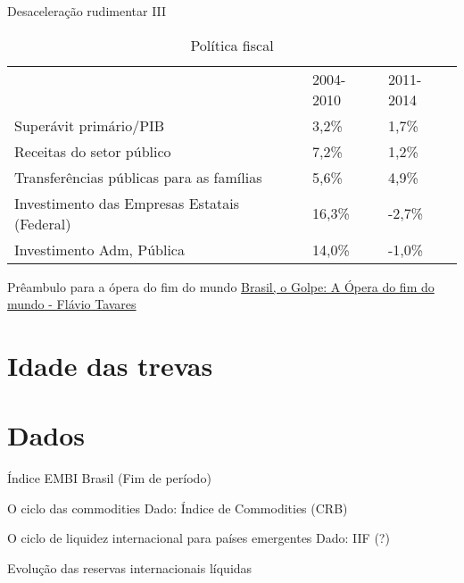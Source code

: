 \documentclass[presentation]{beamer}
\begin{document}
\begin{frame}[label={sec:org6a41466}]{Desaceleração rudimentar III}
\begin{table}[htbp]
\caption{Política fiscal}
\centering
\begin{tabular}{lll}
 & 2004-2010 & 2011-2014\\
Superávit primário/PIB & 3,2\% & 1,7\%\\
Receitas do setor público & 7,2\% & 1,2\%\\
Transferências públicas para as famílias & 5,6\% & 4,9\%\\
Investimento das Empresas Estatais (Federal) & 16,3\% & -2,7\%\\
Investimento Adm, Pública & 14,0\% & -1,0\%\\
\end{tabular}
\end{table}
\end{frame}


\begin{frame}[label={sec:org41550d0}]{Prêambulo para a ópera do fim do mundo}
\href{./opera.jpg}{Brasil, o Golpe: A Ópera do fim do mundo - Flávio Tavares}
\end{frame}

\section{Idade das trevas}
\label{sec:org7f7de19}

\section{Dados}
\label{sec:org0406469}

\begin{frame}[label={sec:orge8af774}]{Índice EMBI Brasil (Fim de período)}
\end{frame}

\begin{frame}[label={sec:orgda8308b}]{O ciclo das commodities}
\alert{Dado:} Índice de Commodities (CRB)
\end{frame}

\begin{frame}[label={sec:orgec1c9cb}]{O ciclo de liquidez internacional para países emergentes}
\alert{Dado:} IIF (?)
\end{frame}

\begin{frame}[label={sec:org0827417}]{Evolução das reservas internacionais líquidas}
\end{frame}
\end{document}
